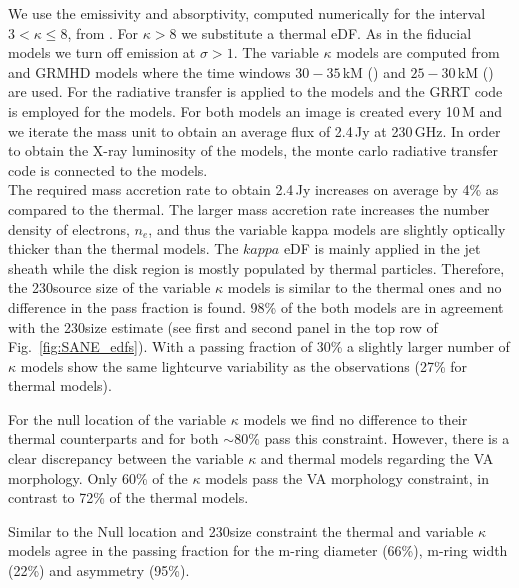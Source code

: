 We use the emissivity and absorptivity, computed numerically for the interval $3 < \kappa \le 8$, from  \cite{2016ApJ...822...34P}.
For $\kappa > 8$ we substitute a thermal eDF.
As in the fiducial models we turn off emission at $\sigma > 1$.
{The variable $\kappa$ models are computed from \hamr and \bhac GRMHD models where the time windows $30-35$\,kM (\hamr) and $25-30$\,kM (\bhac) are used.
For the radiative transfer \ipole is applied to the \hamr models and the GRRT code \bhoss is employed for the \bhac models.
For both models an image is created every 10\,M and we iterate the mass unit to obtain an average flux of 2.4\,Jy at 230\,GHz.
In order to obtain the X-ray luminosity of the models, the monte carlo radiative transfer code \grmonty is connected to the \hamr models.}\\
The required mass accretion rate to obtain 2.4\,Jy increases on average by 4\% as compared to the thermal.
The larger mass accretion rate increases the number density of electrons, $n_e$, and thus the variable kappa models are slightly optically thicker than the thermal models.
 The $kappa$ eDF is mainly applied in the jet sheath while the disk region is mostly populated by thermal particles.
Therefore, the 230\GHz source size of the variable $\kappa$ models is similar to the thermal ones and no difference in the pass fraction is found.
98\% of the both models are in agreement with the 230\GHz size estimate (see first and second panel in the top row of Fig.~\ref{fig:SANE_edfs}).
With a passing fraction of 30\% a slightly larger number of $\kappa$ models show the same lightcurve variability as the observations (27\% for thermal models).


For the null location of the variable $\kappa$ models we find no difference to their thermal counterparts and for both $\sim$80\% pass this constraint.
However, there is a clear discrepancy between the variable $\kappa$ and thermal models regarding the VA morphology.
Only 60\% of the $\kappa$ models pass the VA morphology constraint, in contrast to 72\% of the thermal models.


Similar to the Null location and 230\GHz size constraint the thermal and variable $\kappa$ models agree in the passing fraction for the m-ring diameter (66\%), m-ring width (22\%) and asymmetry (95\%).

